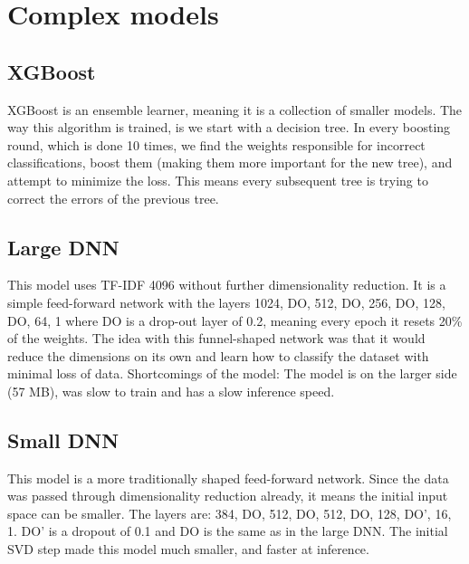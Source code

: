 \section{Complex models}
\subsection{XGBoost}
XGBoost is an ensemble learner, meaning it is a collection of smaller models. The way this algorithm is trained, is we start with a decision tree. In every boosting round, which is done 10 times, we find the weights responsible for incorrect classifications, boost them (making them more important for the new tree), and attempt to minimize the loss. This means every subsequent tree is trying to correct the errors of the previous tree.

\subsection{Large DNN}
This model uses TF-IDF 4096 without further dimensionality reduction. It is a simple feed-forward network with the layers 1024, DO, 512, DO, 256, DO, 128, DO, 64, 1 where DO is a drop-out layer of 0.2, meaning every epoch it resets 20\% of the weights. The idea with this funnel-shaped network was that it would reduce the dimensions on its own and learn how to classify the dataset with minimal loss of data. Shortcomings of the model: The model is on the larger side (57 MB), was slow to train and has a slow inference speed.

\subsection{Small DNN}
This model is a more traditionally shaped feed-forward network. Since the data was passed through dimensionality reduction
already, it means the initial input space can be smaller. The layers are: 384, DO, 512, DO, 512, DO, 128, DO', 16, 1.
DO' is a dropout of 0.1 and DO is the same as in the large DNN. The initial SVD step made this model much smaller, and faster at inference.
